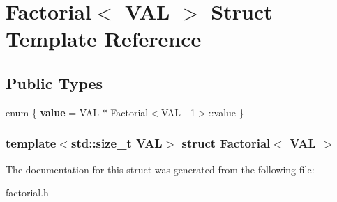 \hypertarget{structFactorial}{
\section{\-Factorial$<$ \-V\-A\-L $>$ \-Struct \-Template \-Reference}
\label{structFactorial}
}
\subsection*{\-Public \-Types}
\begin{DoxyCompactItemize}
\item 
enum \{ {\bfseries value} =  \-V\-A\-L $\ast$ \-Factorial$<$\-V\-A\-L -\/ 1$>$\-:\-:value
 \}
\end{DoxyCompactItemize}
\subsubsection*{template$<$std\-::size\-\_\-t \-V\-A\-L$>$ struct Factorial$<$ V\-A\-L $>$}



\-The documentation for this struct was generated from the following file\-:\begin{DoxyCompactItemize}
\item 
factorial.\-h\end{DoxyCompactItemize}
